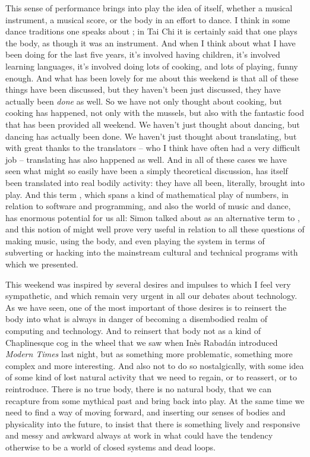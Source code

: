 {This sense of performance brings into play the idea of  itself,
whether  a musical instrument,  a musical score, or  the body in an effort to dance. I think in some dance
traditions one speaks about ; in Tai Chi it is
certainly said that one plays the body, as though it was an instrument.
And when I think about what I have been doing for the last five years,
it's involved having children, it's involved learning languages, it's
involved doing lots of cooking, and lots of playing, funny enough. And
what has been lovely for me about this weekend is that all of these
things have been discussed, but they haven't been just discussed, they
have actually been {\em done} as well. So we have not only thought
about cooking, but cooking has happened, not only with the mussels, but
also with the fantastic food that has been provided all weekend. We
haven't just thought about dancing, but dancing has actually been done.
We haven't just thought about translating, but with great thanks to the
translators {--} who I think have often had a very difficult job {--}
translating has also happened as well. And in all of these cases we
have seen what might so easily have been a simply theoretical
discussion, has itself been translated into real bodily activity: they
have all been, literally, brought into play. And this term {,}
which spans a kind of mathematical play of numbers, in relation to
software and programming, and also the world of music and dance, has
enormous potential for us all: Simon talked about  as an
alternative term to , and this notion of 
might well prove very useful in relation to all these questions of
making music, using the body, and even playing the system in terms of
subverting or hacking into the mainstream cultural and technical
programs with which we presented.

This weekend was inspired by several desires and impulses to which I
feel very sympathetic, and which remain very urgent in all our debates
about technology. As we have seen, one of the most important of those
desires is to reinsert the body into what is always in danger of
becoming a disembodied realm of computing and technology. And to
reinsert that body not as a kind of Chaplinesque cog in the wheel that
we saw when In\`es Rabad\'an introduced {\em Modern Times} last
night, but as something more problematic, something more complex and
more interesting. And also not to do so nostalgically, with some idea
of some kind of lost natural activity that we need to regain, or to
reassert, or to reintroduce. There is no true body, there is no natural
body, that we can recapture from some mythical past and bring back into
play. At the same time we need to find a way of moving forward, and
inserting our senses of bodies and physicality into the future, to
insist that there is something lively and responsive and messy and
awkward always at work in what could have the tendency otherwise to be
a world of closed systems and dead loops. 

}

